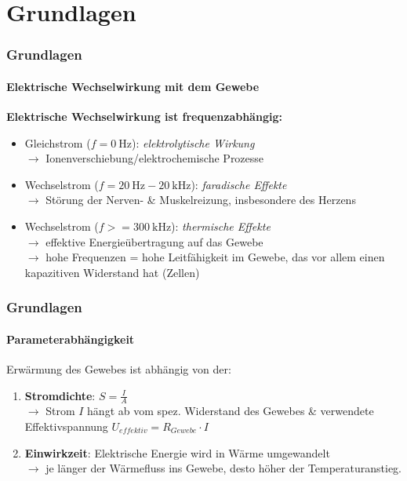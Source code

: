 \documentclass{beamer}
\begin{document}
\section{Grundlagen}
\begin{frame}
\frametitle{Grundlagen}
\framesubtitle{Elektrische Wechselwirkung mit dem Gewebe}
\textbf{Elektrische Wechselwirkung ist frequenzabhängig:}
\vspace{0.5cm}
\begin{itemize}
	\item Gleichstrom ($f=\SI{0}{\hertz}$): \emph{elektrolytische Wirkung} \\$\rightarrow$ Ionenverschiebung/elektrochemische Prozesse
	\vspace{0.2cm}
	\item Wechselstrom ($f=\SI{20}{\hertz}-\SI{20}{\kilo\hertz}$): \emph{faradische  Effekte}
	\\$\rightarrow$ Störung der Nerven- \& Muskelreizung, insbesondere des Herzens
	\vspace{0.2cm}
	\item Wechselstrom ($f>=\SI{300}{\kilo\hertz}$): \emph{thermische Effekte}
	\\$\rightarrow$ effektive Energieübertragung auf das Gewebe
	\\$\rightarrow$ hohe Frequenzen = hohe Leitfähigkeit im Gewebe, das vor allem einen kapazitiven Widerstand hat (Zellen)
\end{itemize}
\end{frame}


\begin{frame}
\frametitle{Grundlagen}
\framesubtitle{Parameterabhängigkeit}
\begin{center}
	Erwärmung des Gewebes ist abhängig von der:
\end{center}
\begin{enumerate}
	\item \textbf{Stromdichte}: $S=\frac{I}{A}$
	\\$\rightarrow$ Strom $I$ hängt ab vom spez. Widerstand des Gewebes \& verwendete Effektivspannung $U_{effektiv}=R_{Gewebe}\cdot I$
	\vspace{0.5cm}
	\item \textbf{Einwirkzeit}: Elektrische Energie wird in Wärme umgewandelt
	\\$\rightarrow$ je länger der Wärmefluss ins Gewebe, desto höher der Temperaturanstieg.
\end{enumerate}
\end{frame}
\end{document}
